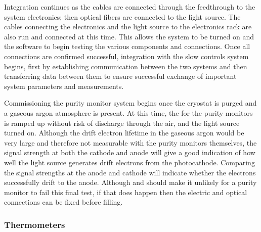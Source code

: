 Integration %
continues as the   cables are connected through the feedthrough to the system   electronics; then optical fibers are connected to the light source.  The cables connecting the  electronics and the light source to the electronics rack %
are also run and connected at this time.  This allows the system to be turned on and the software to begin testing the various components and connections.  Once all connections are confirmed successful, integration with the slow controls system begins, first by establishing communication between the two systems and then transferring data between them to ensure successful exchange of important system parameters and measurements.  

Commissioning the purity monitor system %
begins once the cryostat is purged and a gaseous argon atmosphere is present.  At this time, the  for the purity monitors %
  is ramped up without risk of discharge through the air, and the light source turned on.  Although the drift electron lifetime in the gaseous argon would be very large and therefore not %
  measurable with the purity monitors themselves, the signal strength at both the cathode and anode will %
  give a good indication of how well the light source generates drift electrons from the photocathode.  Comparing the signal strengths at the anode and cathode will indicate whether the electrons successfully drift to the anode.
  Although  and  should make it unlikely for a purity monitor to fail this final test, if that does happen then the electric and optical connections can be fixed before filling.

\subsubsection{Thermometers}
\label{sec:fdgen-slow-cryo-install-th}

